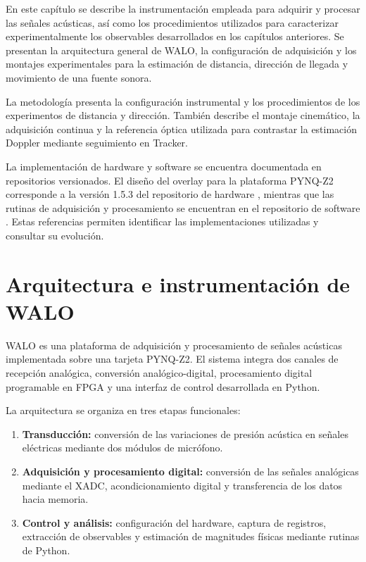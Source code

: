 \label{chap:instrumentacion_metodologia}

En este capítulo se describe la instrumentación empleada para adquirir
y procesar las señales acústicas, así como los procedimientos utilizados
para caracterizar experimentalmente los observables desarrollados en
los capítulos anteriores. Se presentan la arquitectura general de
WALO, la configuración de adquisición y los montajes experimentales
para la estimación de distancia, dirección de llegada y movimiento
de una fuente sonora.

La metodología presenta la configuración instrumental y los
procedimientos de los experimentos de distancia y dirección.
También describe el montaje cinemático, la adquisición continua
y la referencia óptica utilizada para contrastar la estimación
Doppler mediante seguimiento en Tracker.

La implementación de hardware y software se encuentra documentada
en repositorios versionados. El diseño del overlay para la plataforma
PYNQ-Z2 corresponde a la versión 1.5.3 del repositorio de hardware
\cite{SiririHW2026}, mientras que las rutinas de adquisición y
procesamiento se encuentran en el repositorio de software
\cite{SiririSW2026}. Estas referencias permiten identificar las
implementaciones utilizadas y consultar su evolución.

\section{Arquitectura e instrumentación de WALO}
\label{sec:arquitectura_walo}

WALO es una plataforma de adquisición y procesamiento de señales
acústicas implementada sobre una tarjeta PYNQ-Z2. El sistema integra
dos canales de recepción analógica, conversión analógico-digital,
procesamiento digital programable en FPGA y una interfaz de control
desarrollada en Python.

La arquitectura se organiza en tres etapas funcionales:

\begin{enumerate}
    \item \textbf{Transducción:} conversión de las variaciones de
    presión acústica en señales eléctricas mediante dos módulos
    de micrófono.

    \item \textbf{Adquisición y procesamiento digital:} conversión
    de las señales analógicas mediante el XADC, acondicionamiento
    digital y transferencia de los datos hacia memoria.

    \item \textbf{Control y análisis:} configuración del hardware,
    captura de registros, extracción de observables y estimación
    de magnitudes físicas mediante rutinas de Python.
\end{enumerate}

